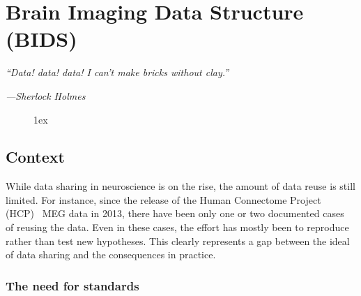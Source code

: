 \chapter{Brain Imaging Data Structure (BIDS)}
\label{chapter:group_study}

\epigraph{\small\itshape ``Data! data! data! I can't make bricks without clay.''}
{\small\textit{---Sherlock Holmes}}

\begin{figure}[ht!]
\centering
\begingroup
\etocstandardlines
\renewcommand{\etocbelowtocskip}{0pt\relax}
\fboxsep1ex
\localtableofcontents
\endgroup
\end{figure}

\clearpage

\section{Context}
While data sharing in neuroscience is on the rise, the amount of data reuse is still limited. For instance, since the release of the Human Connectome Project (HCP)~\citep{larson2013adding} MEG data in 2013, there have been only one or two documented cases~\citep{jas2017autoreject} of reusing the data. Even in these cases, the effort has mostly been to reproduce rather than test new hypotheses. This clearly represents a gap between the ideal of data sharing and the consequences in practice. 


\subsection{The need for standards}

